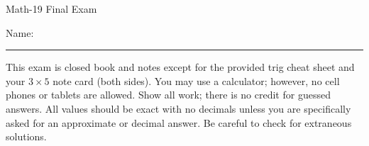 \documentclass[letterpaper,12pt,fleqn]{article}
\begin{document}
\begin{center}
\Large Math-19 Final Exam
\end{center}

\vspace{0.5in}

Name: \rule{4in}{1pt}

\vspace{0.5in}

This exam is closed book and notes except for the provided trig cheat sheet and
your $3\times 5$ note card (both sides). You may use a calculator; however, no
cell phones or tablets are allowed. Show all work; there is no credit for
guessed answers. All values should be exact with no decimals unless you are
specifically asked for an approximate or decimal answer. Be careful to check
for extraneous solutions.

\vspace{0.5in}

\begin{center}
\end{center}
\end{document}
